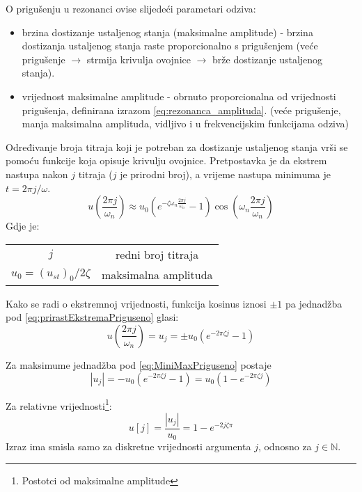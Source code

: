 O prigušenju u rezonanci ovise slijedeći parametari odziva:
\begin{itemize}
    \item brzina dostizanje ustaljenog stanja (maksimalne amplitude) - brzina dostizanja 
        ustaljenog stanja raste proporcionalno s prigušenjem (veće prigušenje $\to$ strmija krivulja
        ovojnice $\to$ brže dostizanje ustaljenog stanja).

    \item vrijednost maksimalne amplitude - obrnuto proporcionalna od vrijednosti
        prigušenja, definirana izrazom \eqref{eq:rezonanca_amplituda}. 
        (veće prigušenje, manja maksimalna amplituda, vidljivo i u frekvencijskim funkcijama odziva)
\end{itemize}

Određivanje broja titraja koji je potreban za dostizanje ustaljenog stanja vrši
se pomoću funkcije koja opisuje krivulju ovojnice. Pretpostavka je da ekstrem
nastupa nakon $j$ titraja ($j$ je prirodni broj), a vrijeme nastupa minimuma je
$t=2\pi j/\omega$. 
\begin{equation}\label{eq:prirastEkstremaPriguseno}
    u\left(\frac{2\pi j}{\omega_n}\right) \approx
        u_0(e^{-\zeta\omega_n\frac{2\pi j}{\omega_n}}-1)\cos\left(\omega_n\frac{2\pi
        j}{\omega_n}\right)
\end{equation}
Gdje je:
\begin{table}[H]
    \begin{tabular}{c c}
        $j$ & redni broj titraja\\
        $u_0=(u_{st})_0/2\zeta$ & maksimalna amplituda\\
    \end{tabular}
\end{table}
Kako se radi o ekstremnoj vrijednosti, funkcija kosinus iznosi $\pm 1$ pa jednadžba
pod \eqref{eq:prirastEkstremaPriguseno} glasi:
\begin{equation}\label{eq:MiniMaxPriguseno}
     u\left(\frac{2\pi j}{\omega_n}\right) = u_j = 
        \pm u_0(e^{-2\pi\zeta j}-1)
\end{equation}

Za maksimume jednadžba pod \eqref{eq:MiniMaxPriguseno} postaje
\begin{equation}
    |u_j| = -u_0(e^{-2\pi\zeta j} -1) = u_0(1-e^{-2\pi\zeta j})
\end{equation}

Za relativne vrijednosti\footnote{Postotci od maksimalne amplitude}:
\begin{equation}
    u[j] = \frac{|u_j|}{u_0}=1-e^{-2j\zeta\pi}
\end{equation}
Izraz ima smisla samo za diskretne vrijednosti argumenta $j$, odnosno za $j \in
\mathbb{N}$.

